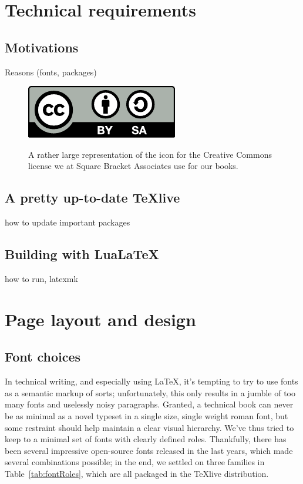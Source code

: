 \documentclass[twoside,openany,showtrims]{sbabook}
\begin{document}
\tableofcontents*

\clearpage
\listoffigures

\mainmatter


\chapter{Technical requirements}


\section{Motivations}

Reasons (fonts, packages)

\begin{figure}[tb]
  \caption{A rather large representation of the icon for the Creative Commons
    license we at Square Bracket Associates use for our books.}
  \includegraphics{CreativeCommons-BY-SA}
  \label{fig:cc-by-sa-icon}
\end{figure}


\section{A pretty up-to-date TeXlive}

how to update
important packages


\section{Building with Lua\LaTeX}

how to run, latexmk


\chapter{Page layout and design}


\section{Font choices}

In technical writing, and especially using \LaTeX{}, it's tempting to try to use
fonts as a semantic markup of sorts; unfortunately, this only results in a
jumble of too many fonts and uselessly noisy paragraphs.
Granted, a technical book can never be as minimal as a novel typeset in a single
size, single weight roman font, but some restraint should help maintain a clear
visual hierarchy.
We've thus tried to keep to a minimal set of fonts with clearly defined roles.
Thankfully, there has been several impressive open-source fonts released in the
last years, which made several combinations possible; in the end, we settled on
three families in Table~\ref{tab:fontRoles}, which are all packaged in the
\TeX{}live distribution.
\end{document}
